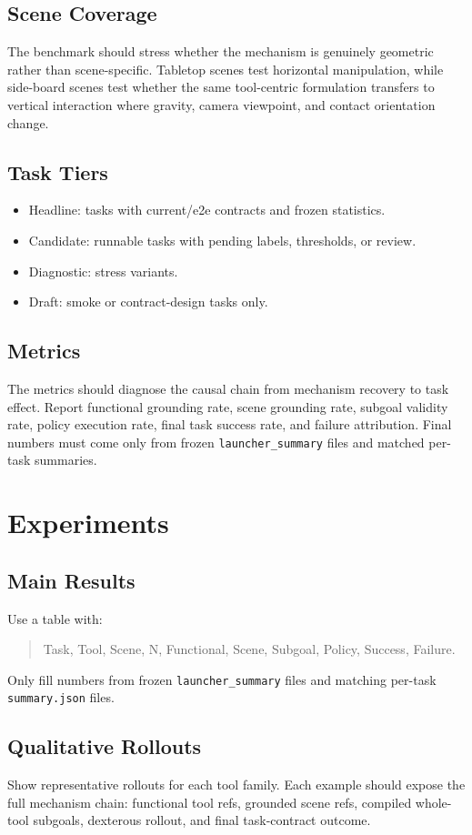 \documentclass[journal]{IEEEtran}
\begin{document}
\subsection{Scene Coverage}
The benchmark should stress whether the mechanism is genuinely geometric rather
than scene-specific. Tabletop scenes test horizontal manipulation, while
side-board scenes test whether the same tool-centric formulation transfers to
vertical interaction where gravity, camera viewpoint, and contact orientation
change.

\subsection{Task Tiers}
\begin{itemize}
  \item Headline: tasks with current/e2e contracts and frozen statistics.
  \item Candidate: runnable tasks with pending labels, thresholds, or review.
  \item Diagnostic: stress variants.
  \item Draft: smoke or contract-design tasks only.
\end{itemize}

\subsection{Metrics}
The metrics should diagnose the causal chain from mechanism recovery to task
effect. Report functional grounding rate, scene grounding rate, subgoal
validity rate, policy execution rate, final task success rate, and failure
attribution. Final numbers must come only from frozen
\texttt{launcher\_summary} files and matched per-task summaries.

\section{Experiments}
\subsection{Main Results}
Use a table with:
\begin{quote}
Task, Tool, Scene, N, Functional, Scene, Subgoal, Policy, Success, Failure.
\end{quote}
Only fill numbers from frozen \texttt{launcher\_summary} files and matching
per-task \texttt{summary.json} files.

\subsection{Qualitative Rollouts}
Show representative rollouts for each tool family. Each example should expose
the full mechanism chain: functional tool refs, grounded scene refs, compiled
whole-tool subgoals, dexterous rollout, and final task-contract outcome.
\end{document}
